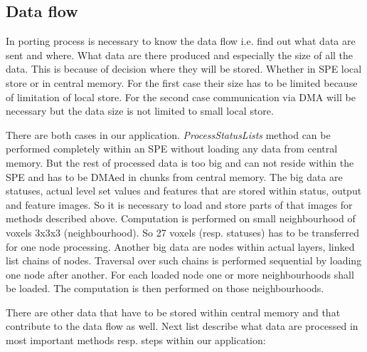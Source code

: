 \subsection{Data flow}

\par
In porting process is necessary to know the data flow i.e. find out what data are sent and where.
What data are there produced and especially the size of all the data.
This is because of decision where they will be stored.
Whether in SPE local store or in central memory.
For the first case their size has to be limited because of limitation of local store.
For the second case communication via DMA will be necessary but the data size is not limited to small local store.

\par
There are both cases in our application.
\mbox{\emph{ProcessStatusLists}} method can be performed completely within an SPE without loading any data from central memory.
But the rest of processed data is too big and can not reside within the SPE and has to be DMAed in chunks from central memory.
The big data are statuses, actual level set values and features that are stored within status, output and feature images.
So it is necessary to load and store parts of that images for methods described above.
Computation is performed on small neighbourhood of voxels 3x3x3 (neighbourhood).
So 27 voxels (resp. statuses) has to be transferred for one node processing.
Another big data are nodes within actual layers, linked list chains of nodes.
Traversal over such chains is performed sequential by loading one node after another.
For each loaded node one or more neighbourhoods shall be loaded.
The computation is then performed on those neighbourhoods.

\par
There are other data that have to be stored within central memory and that contribute to the data flow as well.
Next list describe what data are processed in most important methods resp. steps within our application:\\

